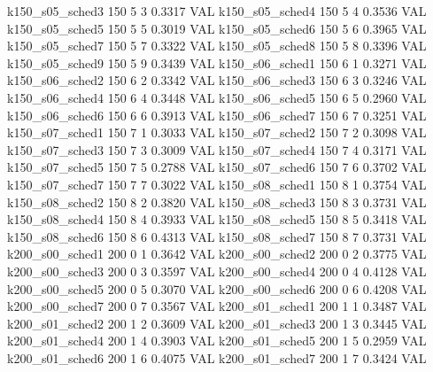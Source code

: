   k150_s05_sched3                  150    5   3    0.3317  VAL
  k150_s05_sched4                  150    5   4    0.3536  VAL
  k150_s05_sched5                  150    5   5    0.3019  VAL
  k150_s05_sched6                  150    5   6    0.3965  VAL
  k150_s05_sched7                  150    5   7    0.3322  VAL
  k150_s05_sched8                  150    5   8    0.3396  VAL
  k150_s05_sched9                  150    5   9    0.3439  VAL
  k150_s06_sched1                  150    6   1    0.3271  VAL
  k150_s06_sched2                  150    6   2    0.3342  VAL
  k150_s06_sched3                  150    6   3    0.3246  VAL
  k150_s06_sched4                  150    6   4    0.3448  VAL
  k150_s06_sched5                  150    6   5    0.2960  VAL
  k150_s06_sched6                  150    6   6    0.3913  VAL
  k150_s06_sched7                  150    6   7    0.3251  VAL
  k150_s07_sched1                  150    7   1    0.3033  VAL
  k150_s07_sched2                  150    7   2    0.3098  VAL
  k150_s07_sched3                  150    7   3    0.3009  VAL
  k150_s07_sched4                  150    7   4    0.3171  VAL
  k150_s07_sched5                  150    7   5    0.2788  VAL
  k150_s07_sched6                  150    7   6    0.3702  VAL
  k150_s07_sched7                  150    7   7    0.3022  VAL
  k150_s08_sched1                  150    8   1    0.3754  VAL
  k150_s08_sched2                  150    8   2    0.3820  VAL
  k150_s08_sched3                  150    8   3    0.3731  VAL
  k150_s08_sched4                  150    8   4    0.3933  VAL
  k150_s08_sched5                  150    8   5    0.3418  VAL
  k150_s08_sched6                  150    8   6    0.4313  VAL
  k150_s08_sched7                  150    8   7    0.3731  VAL
  k200_s00_sched1                  200    0   1    0.3642  VAL
  k200_s00_sched2                  200    0   2    0.3775  VAL
  k200_s00_sched3                  200    0   3    0.3597  VAL
  k200_s00_sched4                  200    0   4    0.4128  VAL
  k200_s00_sched5                  200    0   5    0.3070  VAL
  k200_s00_sched6                  200    0   6    0.4208  VAL
  k200_s00_sched7                  200    0   7    0.3567  VAL
  k200_s01_sched1                  200    1   1    0.3487  VAL
  k200_s01_sched2                  200    1   2    0.3609  VAL
  k200_s01_sched3                  200    1   3    0.3445  VAL
  k200_s01_sched4                  200    1   4    0.3903  VAL
  k200_s01_sched5                  200    1   5    0.2959  VAL
  k200_s01_sched6                  200    1   6    0.4075  VAL
  k200_s01_sched7                  200    1   7    0.3424  VAL
